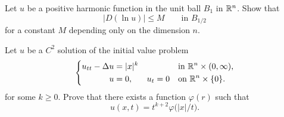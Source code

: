 \begin{problem}
  Let \(u\) be a positive harmonic function in the unit ball \(B_1\) in
  \(\mathbb{R}^n\). Show that
  \[
    \bigl|D(\ln u)\bigr|\leq M\qquad \text{in \(B_{1/2}\)}
  \]
  for a constant \(M\) depending only on the dimension \(n\).

\end{problem}
\begin{solution*}
\end{solution*}

\begin{problem}
  Let \(u\) be a \(C^2\) solution of the initial value problem
  \[
    \left\{
    \begin{aligned}
      u_{tt}-\Delta u&=|x|^k&&&&\text{in \(\mathbb{R}^n\times(0,\infty)\),}\\
      u&=0,&u_t&=0&&\text{on \(\mathbb{R}^n\times\{0\}\)}.
    \end{aligned}
    \right.
  \]
  for some \(k\geq 0\). Prove that there exists a function \(\varphi(r)\)
  such that
  \[
    u(x,t)=t^{k+2}\varphi\bigl(|x|/t\bigr).
  \]

  \noindent [\emph{Hint:} As one of the steps show that \(u\) is
  \((k+2)\)-homogeneous in \((x,t)\) variables, i.e.,
  \(u(\lambda x,\lambda t)=\lambda^{k+2}u(x,t)\) for any \(\lambda >0\).]
\end{problem}
\begin{solution*}
\end{solution*}

